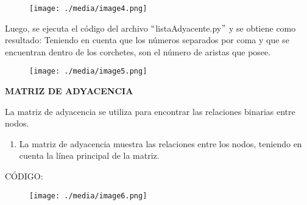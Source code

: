 \documentclass[12pt]{article}
\renewcommand{\_}{\kern-1.5pt\textunderscore\kern-1.5pt}
\begin{document}

\begin{figure}[H]
	\begin{Center}
		\texttt{[image: ./media/image4.png]}
	\end{Center}
\end{figure}



\par

Luego, se ejecuta el código del archivo $``$listaAdyacente.py$"$  y se obtiene como resultado: Teniendo en cuenta que los números separados por coma y que se encuentran dentro de los corchetes, son el número de aristas que posee.\par




\begin{figure}[H]
	\begin{Center}
		\texttt{[image: ./media/image5.png]}
	\end{Center}
\end{figure}



\par

\textbf{MATRIZ DE ADYACENCIA}\par

La matriz de adyacencia se utiliza para encontrar las relaciones binarias entre nodos.\par

\begin{enumerate}
	\item La matriz de adyacencia muestra las relaciones entre los nodos, teniendo en cuenta la línea principal de la matriz.
\end{enumerate}\par

CÓDIGO:\par




\begin{figure}[H]
	\begin{Center}
		\texttt{[image: ./media/image6.png]}
	\end{Center}
\end{figure}
\end{document}
